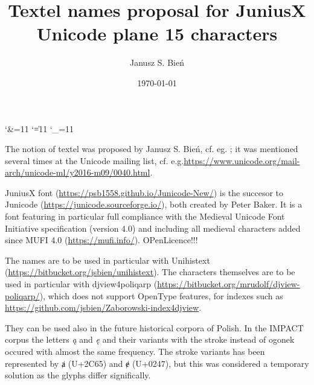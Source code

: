 \documentclass{article}
\begin{document}
% 
\title{Textel names proposal for JuniusX\\ Unicode plane 15 characters}

\author{Janusz S. Bień}

\date{\today}

\maketitle

\catcode`\&=11
\catcode`\|=11
\catcode`\_=11





The notion of textel was proposed by Janusz S. Bień,
cf. eg. %
\autocite{bc381}; it was mentioned several times at the Unicode
mailing list,
cf. e.g.\url{https://www.unicode.org/mail-arch/unicode-ml/y2016-m09/0040.html}.

JuniusX font (\url{https://psb1558.github.io/Junicode-New/}) is the
succesor to Junicode (\url{https://junicode.sourceforge.io/}),
both created by Peter Baker. It is a font featuring in particular full
compliance with the Medieval Unicode Font Initiative specification
(version 4.0) and including all medieval characters added
since MUFI 4.0 (\url{https://mufi.info/}). OPenLicence!!!

The names are to be used in particular with \textsf{Unihistext}
(\url{https://bitbucket.org/jsbien/unihistext}).  The characters
themselves are to be used in particular with \textsf{djview4poliqarp}
(\url{https://bitbucket.org/mrudolf/djview-poliqarp/}), which does not
support OpenType features, for indexes such as
\url{https://github.com/jsbien/Zaborowski-index4djview}.

They can be used also in the future historical corpora of Polish.  In
the IMPACT corpus \autocite{bc289} the letters \textit{ą} and \textit{ę}
and their variants with the stroke instead of ogonek occured with
almost the same frequency. The stroke variants has been represented by
{ⱥ} (U+2C65) and {ɇ} (U+0247), but this was considered
 a temporary solution as the glyphs differ significally.
\end{document}
